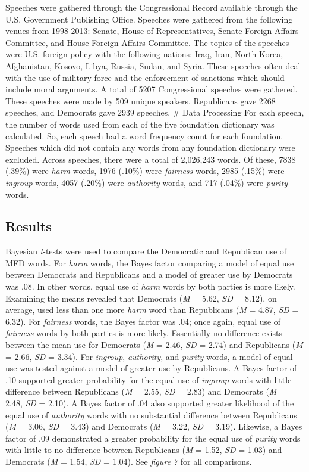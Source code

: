 \documentclass[english,man]{apa6}
\newcounter{author}
\theoremstyle{definition}
\theoremstyle{definition}
\theoremstyle{definition}
\theoremstyle{remark}
\begin{document}
Speeches were gathered through the Congressional Record available
through the U.S. Government Publishing Office. Speeches were gathered
from the following venues from 1998-2013: Senate, House of
Representatives, Senate Foreign Affairs Committee, and House Foreign
Affairs Committee. The topics of the speeches were U.S. foreign policy
with the following nations: Iraq, Iran, North Korea, Afghanistan,
Kosovo, Libya, Russia, Sudan, and Syria. These speeches often deal with
the use of military force and the enforcement of sanctions which should
include moral arguments. A total of 5207 Congressional speeches were
gathered. These speeches were made by 509 unique speakers. Republicans
gave 2268 speeches, and Democrats gave 2939 speeches. \# Data Processing
For each speech, the number of words used from each of the five
foundation dictionary was calculated. So, each speech had a word
frequency count for each foundation. Speeches which did not contain any
words from any foundation dictionary were excluded. Across speeches,
there were a total of 2,026,243 words. Of these, 7838 (.39\%) were
\emph{harm} words, 1976 (.10\%) were \emph{fairness} words, 2985 (.15\%)
were \emph{ingroup} words, 4057 (.20\%) were \emph{authority} words, and
717 (.04\%) were \emph{purity} words.

\subsection{Results}\label{results-1}

Bayesian \emph{t}-tests were used to compare the Democratic and
Republican use of MFD words. For \emph{harm} words, the Bayes factor
comparing a model of equal use between Democrats and Republicans and a
model of greater use by Democrats was .08. In other words, equal use of
\emph{harm} words by both parties is more likely. Examining the means
revealed that Democrats (\emph{M} = 5.62, \emph{SD} = 8.12), on average,
used less than one more \emph{harm} word than Republicans (\emph{M} =
4.87, \emph{SD} = 6.32). For \emph{fairness} words, the Bayes factor was
.04; once again, equal use of \emph{fairness} words by both parties is
more likely. Essentially no difference exists between the mean use for
Democrats (\emph{M} = 2.46, \emph{SD} = 2.74) and Republicans (\emph{M}
= 2.66, \emph{SD} = 3.34). For \emph{ingroup}, \emph{authority}, and
\emph{purity} words, a model of equal use was tested against a model of
greater use by Republicans. A Bayes factor of .10 supported greater
probability for the equal use of \emph{ingroup} words with little
difference between Republicans (\emph{M} = 2.55, \emph{SD} = 2.83) and
Democrats (\emph{M} = 2.48, \emph{SD} = 2.10). A Bayes factor of .04
also supported greater likelihood of the equal use of \emph{authority}
words with no substantial difference between Republicans (\emph{M} =
3.06, \emph{SD} = 3.43) and Democrats (\emph{M} = 3.22, \emph{SD} =
3.19). Likewise, a Bayes factor of .09 demonstrated a greater
probability for the equal use of \emph{purity} words with little to no
difference between Republicans (\emph{M} = 1.52, \emph{SD} = 1.03) and
Democrats (\emph{M} = 1.54, \emph{SD} = 1.04). See \emph{figure ?} for
all comparisons.
\end{document}
